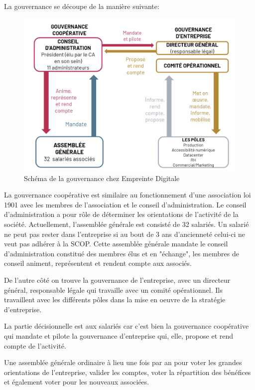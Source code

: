 \documentclass[12pt, a4paper, twoside]{article}
\begin{document}
\newpage
La gouvernance se découpe de la manière suivante:
\begin{figure}[!ht]
    \centering
    \includegraphics[width=\textwidth]{src/scheme_scop_ed.png}
    \caption{Schéma de la gouvernance chez Empreinte Digitale}
    \label{fig:gouvernance_ed}
\end{figure}

La gouvernance coopérative est similaire au fonctionnement d'une association loi 1901 avec les membres de l'association et le conseil d'administration. 
Le conseil d'administration a pour rôle de déterminer les orientations de l'activité de la société. 
Actuellement, l'assemblée générale est consisté de 32 salariés. 
Un salarié ne peut pas rester dans l'entreprise si au bout de 3 ans d'ancienneté celui-ci ne veut pas adhérer à la \gls{SCOP}. 
Cette assemblée générale mandate le conseil d'administration constitué des membres élus et en "échange", les membres de conseil animent, représentent et rendent compte aux associés.

De l'autre côté on trouve la gouvernance de l'entreprise, avec un directeur général, responsable légale qui travaille avec un comité opérationnel. 
Ils travaillent avec les différents pôles dans la mise en oeuvre de la stratégie d'entreprise.

La partie décisionnelle est aux salariés car c'est bien la gouvernance coopérative qui mandate et pilote la gouvernance d'entreprise qui, elle, propose et rend compte de l'activité.

Une assemblée générale ordinaire à lieu une fois par an pour voter les grandes orientations de l'entreprise, valider les comptes, voter la répartition des bénéfices et également voter pour les nouveaux associées.
\end{document}
